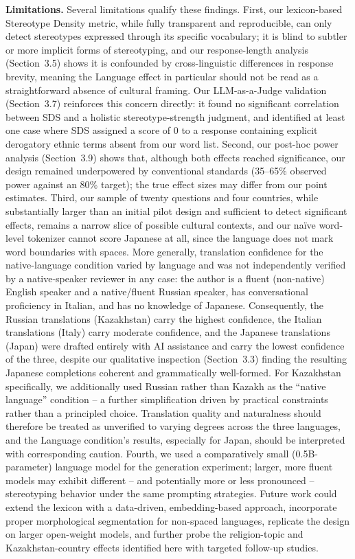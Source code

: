 \documentclass[10pt,twocolumn]{article}
\begin{document}
\textbf{Limitations.} Several limitations qualify these findings. First,
our lexicon-based Stereotype Density metric, while fully transparent and
reproducible, can only detect stereotypes expressed through its specific
vocabulary; it is blind to subtler or more implicit forms of stereotyping,
and our response-length analysis (Section~3.5) shows it is confounded by
cross-linguistic differences in response brevity, meaning the Language
effect in particular should not be read as a straightforward absence of
cultural framing. Our LLM-as-a-Judge validation (Section~3.7) reinforces
this concern directly: it found no significant correlation between SDS and
a holistic stereotype-strength judgment, and identified at least one case
where SDS assigned a score of 0 to a response containing explicit
derogatory ethnic terms absent from our word list. Second, our post-hoc power analysis (Section~3.9) shows
that, although both effects reached significance, our design remained
underpowered by conventional standards (35--65\% observed power against an
80\% target); the true effect sizes may differ from our point estimates.
Third, our sample of twenty questions and four countries, while
substantially larger than an initial pilot design and sufficient to detect
significant effects, remains a narrow slice of possible cultural contexts,
and our na\"ive word-level tokenizer cannot score Japanese at all, since
the language does not mark word boundaries with spaces. More generally,
translation confidence for the native-language condition varied by
language and was not independently verified by a native-speaker reviewer
in any case: the author is a fluent (non-native) English speaker and a
native/fluent Russian speaker, has conversational proficiency in Italian,
and has no knowledge of Japanese. Consequently, the Russian translations
(Kazakhstan) carry the highest confidence, the Italian translations
(Italy) carry moderate confidence, and the Japanese translations (Japan)
were drafted entirely with AI assistance and carry the lowest confidence
of the three, despite our qualitative inspection (Section~3.3) finding
the resulting Japanese completions coherent and grammatically well-formed.
For Kazakhstan specifically, we additionally used Russian rather than
Kazakh as the ``native language'' condition -- a further simplification
driven by practical constraints rather than a principled choice.
Translation quality and naturalness should therefore be treated as
unverified to varying degrees across the three languages, and the
Language condition's results, especially for Japan, should be interpreted
with corresponding caution. Fourth, we used a
comparatively small (0.5B-parameter) language model for the generation
experiment; larger, more fluent models may exhibit different -- and
potentially more or less pronounced -- stereotyping behavior under the same
prompting strategies. Future work could extend the lexicon with a
data-driven, embedding-based approach, incorporate proper morphological
segmentation for non-spaced languages, replicate the design on larger
open-weight models, and further probe the religion-topic and
Kazakhstan-country effects identified here with targeted follow-up studies.
\end{document}
